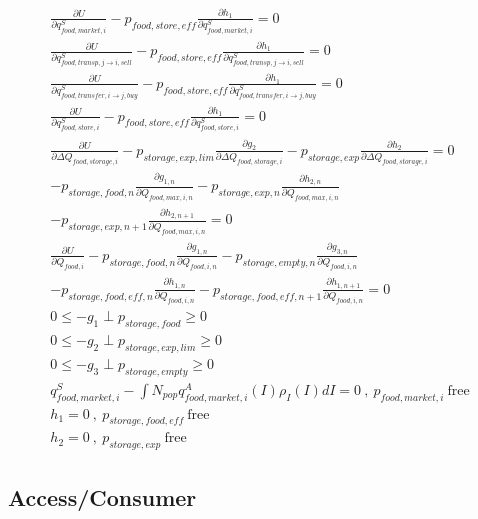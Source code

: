 \documentclass[letter,12pt]{article}
\begin{document}
\begin{gather}
\frac{\partial U}{\partial q_{food,market,i}^S} - p_{food,store,eff} \frac{\partial h_1}{\partial q_{food,market,i}^S} = 0 \\
\frac{\partial U}{\partial q_{food,transp,j \rightarrow i,sell}^S} - p_{food,store,eff} \frac{\partial h_1}{\partial q_{food,transp,j \rightarrow i,sell}^S} = 0 \\
\frac{\partial U}{\partial q_{food,transfer,i \rightarrow j,buy}^S} - p_{food,store,eff} \frac{\partial h_1}{\partial q_{food,transfer,i \rightarrow j,buy}^S} = 0 \\
\frac{\partial U}{\partial q_{food,store,i}^S} - p_{food,store,eff} \frac{\partial h_1}{\partial q_{food,store,i}^S} = 0 \\
\frac{\partial U}{\partial \Delta Q_{food,storage,i}} - p_{storage,exp,lim} \frac{\partial g_2}{\partial \Delta Q_{food,storage,i}} - p_{storage,exp} \frac{\partial h_2}{\partial \Delta Q_{food,storage,i}} = 0 \\
- p_{storage,food,n} \frac{\partial g_{1,n}}{\partial Q_{food,max,i,n}} - p_{storage,exp,n} \frac{\partial h_{2,n}}{\partial Q_{food,max,i,n}} \nonumber \\
- p_{storage,exp,n+1} \frac{\partial h_{2,n+1}}{\partial Q_{food,max,i,n}} = 0 \\
\frac{\partial U}{\partial Q_{food,i}} - p_{storage,food,n} \frac{\partial g_{1,n}}{\partial Q_{food,i,n}} - p_{storage,empty,n} \frac{\partial g_{3,n}}{\partial Q_{food,i,n}} \nonumber \\
 - p_{storage,food,eff,n} \frac{\partial h_{1,n}}{\partial Q_{food,i,n}} - p_{storage,food,eff,n+1} \frac{\partial h_{1,n+1}}{\partial Q_{food,i,n}} = 0 \\
0 \leq -g_1 \perp p_{storage,food} \geq 0 \\
0 \leq -g_2 \perp p_{storage,exp,lim} \geq 0 \\
0 \leq -g_3 \perp p_{storage,empty} \geq 0 \\
q_{food,market,i}^S - \int N_{pop} q_{food,market,i}^A \left(I\right) \rho_I \left(I\right) dI = 0 \ , \ p_{food,market,i} \ \text{free} \\
h_1 = 0 \ , \ p_{storage,food,eff} \ \text{free} \\
h_2 = 0 \ , \ p_{storage,exp} \ \text{free}
\end{gather}

\subsection{Access/Consumer}
\end{document}
